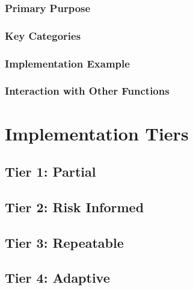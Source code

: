 \subsubsection{Primary Purpose}

\subsubsection{Key Categories}



\subsubsection{Implementation Example}

\subsubsection{Interaction with Other Functions}


\section{Implementation Tiers}


\subsection{Tier 1: Partial}


\subsection{Tier 2: Risk Informed}


\subsection{Tier 3: Repeatable}


\subsection{Tier 4: Adaptive}

